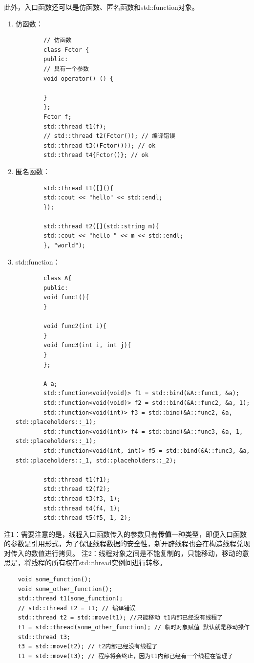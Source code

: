 此外，入口函数还可以是仿函数、匿名函数和std::function对象。
\begin{enumerate}
	\item 仿函数：
	\begin{lstlisting}
		// 仿函数
		class Fctor {
		public:
		// 具有一个参数
		void operator() () {
		
		}
		};
		Fctor f;
		std::thread t1(f);  
		// std::thread t2(Fctor()); // 编译错误 
		std::thread t3((Fctor())); // ok
		std::thread t4{Fctor()}; // ok
	\end{lstlisting}
	\item 匿名函数：
	\begin{lstlisting}
		std::thread t1([](){
		std::cout << "hello" << std::endl;
		});
		
		std::thread t2([](std::string m){
		std::cout << "hello " << m << std::endl;
		}, "world");
	\end{lstlisting}
	\item std::function：
	\begin{lstlisting}
		class A{
		public:
		void func1(){
		}
		
		void func2(int i){
		}
		void func3(int i, int j){
		}
		};
		
		A a;
		std::function<void(void)> f1 = std::bind(&A::func1, &a);
		std::function<void(void)> f2 = std::bind(&A::func2, &a, 1);
		std::function<void(int)> f3 = std::bind(&A::func2, &a, std::placeholders::_1);
		std::function<void(int)> f4 = std::bind(&A::func3, &a, 1, std::placeholders::_1);
		std::function<void(int, int)> f5 = std::bind(&A::func3, &a, std::placeholders::_1, std::placeholders::_2);
		
		std::thread t1(f1);
		std::thread t2(f2);
		std::thread t3(f3, 1);
		std::thread t4(f4, 1);
		std::thread t5(f5, 1, 2);
	\end{lstlisting}
\end{enumerate}

注1：需要注意的是，线程入口函数传入的参数只有\textbf{传值}一种类型，即便入口函数的参数是引用形式，为了保证线程数据的安全性，新开辟线程也会在构造线程兑现对传入的数值进行拷贝。
注2：线程对象之间是不能复制的，只能移动，移动的意思是，将线程的所有权在std::thread实例间进行转移。
\begin{lstlisting}
	void some_function();
	void some_other_function();
	std::thread t1(some_function);
	// std::thread t2 = t1; // 编译错误
	std::thread t2 = std::move(t1); //只能移动 t1内部已经没有线程了
	t1 = std::thread(some_other_function); // 临时对象赋值 默认就是移动操作
	std::thread t3;
	t3 = std::move(t2); // t2内部已经没有线程了
	t1 = std::move(t3); // 程序将会终止，因为t1内部已经有一个线程在管理了
\end{lstlisting}
